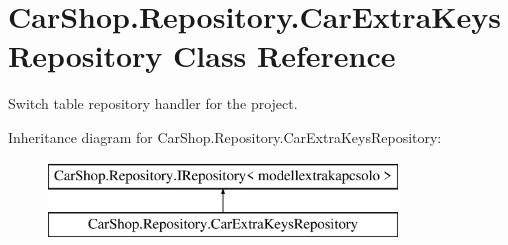 \hypertarget{class_car_shop_1_1_repository_1_1_car_extra_keys_repository}{}\section{Car\+Shop.\+Repository.\+Car\+Extra\+Keys\+Repository Class Reference}
\label{class_car_shop_1_1_repository_1_1_car_extra_keys_repository}


Switch table repository handler for the project.  


Inheritance diagram for Car\+Shop.\+Repository.\+Car\+Extra\+Keys\+Repository\+:\begin{figure}[H]
\begin{center}
\leavevmode
\includegraphics[height=2.000000cm]{class_car_shop_1_1_repository_1_1_car_extra_keys_repository}
\end{center}
\end{figure}

